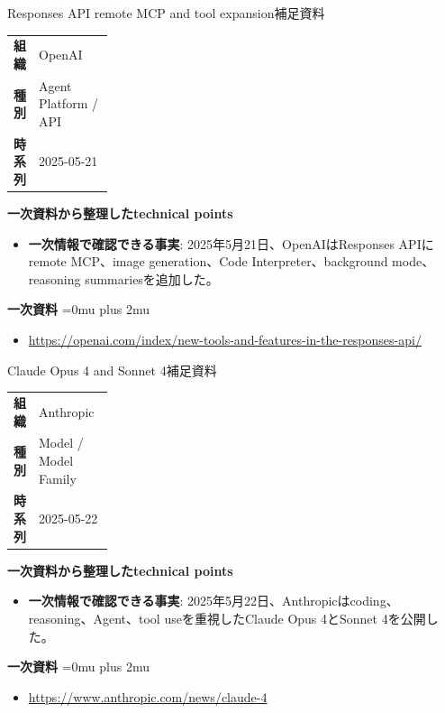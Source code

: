 \begin{technicalnote}{Responses API remote MCP and tool expansion}{補足資料}
\begingroup
\begin{tabularx}{\linewidth}{@{}>{\bfseries}p{0.22\linewidth}X@{}}
組織 & OpenAI \\
種別 & Agent Platform / API \\
時系列 & 2025-05-21 \\
\end{tabularx}
\smallskip
{\bfseries 一次資料から整理したtechnical points}
\begin{itemize}[leftmargin=1.5em,itemsep=0.35em]
\item \textbf{一次情報で確認できる事実}: 2025年5月21日、OpenAIはResponses APIにremote MCP、image generation、Code Interpreter、background mode、reasoning summariesを追加した。
\end{itemize}
\begin{samepage}
{\bfseries 一次資料}
\begingroup\sloppy
\Urlmuskip=0mu plus 2mu\relax
\begin{itemize}[leftmargin=1.5em,itemsep=0.25em]
\item {\scriptsize\url{https://openai.com/index/new-tools-and-features-in-the-responses-api/}}
\end{itemize}
\endgroup
\end{samepage}
\endgroup
\end{technicalnote}
\medskip

\begin{technicalnote}{Claude Opus 4 and Sonnet 4}{補足資料}
\begingroup
\begin{tabularx}{\linewidth}{@{}>{\bfseries}p{0.22\linewidth}X@{}}
組織 & Anthropic \\
種別 & Model / Model Family \\
時系列 & 2025-05-22 \\
\end{tabularx}
\smallskip
{\bfseries 一次資料から整理したtechnical points}
\begin{itemize}[leftmargin=1.5em,itemsep=0.35em]
\item \textbf{一次情報で確認できる事実}: 2025年5月22日、Anthropicはcoding、reasoning、Agent、tool useを重視したClaude Opus 4とSonnet 4を公開した。
\end{itemize}
\begin{samepage}
{\bfseries 一次資料}
\begingroup\sloppy
\Urlmuskip=0mu plus 2mu\relax
\begin{itemize}[leftmargin=1.5em,itemsep=0.25em]
\item {\scriptsize\url{https://www.anthropic.com/news/claude-4}}
\end{itemize}
\endgroup
\end{samepage}
\endgroup
\end{technicalnote}
\medskip


